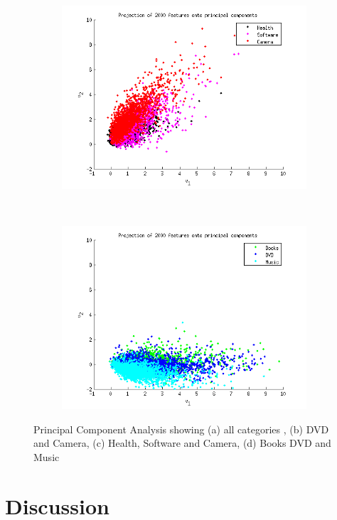\begin{figure}[h!btcp]
	    \begin{subfigure}[b]{0.5\textwidth}
	            \centering
	            \includegraphics[width=\linewidth]{../Plottar/pca_largecorr.png}
	                           \caption{}
	    \end{subfigure}%
	    ~ %
	    \begin{subfigure}[b]{0.5\textwidth}
	            \centering
	            \includegraphics[width=\textwidth]{../Plottar/pca_somecorr.png} 
              \caption{}
	    \end{subfigure}
	    \caption{Principal Component Analysis showing (a) all categories , (b) DVD and Camera, (c) Health, Software and Camera, (d) Books DVD and Music}
	    \label{fig:pca_results}
\end{figure}


\section{Discussion}

